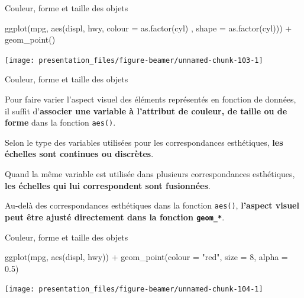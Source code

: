 \documentclass[12pt,handout,ignorenonframetext,]{beamer}
\newenvironment{Shaded}{}{}
\newcommand{\KeywordTok}[1]{\textcolor[rgb]{0.00,0.00,1.00}{{#1}}}
\newcommand{\DataTypeTok}[1]{{#1}}
\newcommand{\DecValTok}[1]{{#1}}
\newcommand{\FloatTok}[1]{{#1}}
\newcommand{\StringTok}[1]{\textcolor[rgb]{0.00,0.50,0.50}{{#1}}}
\newcommand{\NormalTok}[1]{{#1}}
\renewenvironment{Shaded}{\begin{snugshade}}{\end{snugshade}}
\begin{document}
\begin{frame}[fragile]{Couleur, forme et taille des objets}

\footnotesize \center

\begin{Shaded}
\begin{Highlighting}[]
\KeywordTok{ggplot}\NormalTok{(mpg, }\KeywordTok{aes}\NormalTok{(displ, hwy, }\DataTypeTok{colour =} \KeywordTok{as.factor}\NormalTok{(cyl)}
  \NormalTok{, }\DataTypeTok{shape =} \KeywordTok{as.factor}\NormalTok{(cyl))) +}
\StringTok{  }\KeywordTok{geom_point}\NormalTok{()}
\end{Highlighting}
\end{Shaded}

\texttt{[image: presentation\_files/figure-beamer/unnamed-chunk-103-1]}

\end{frame}

\begin{frame}{Couleur, forme et taille des objets}

Pour faire varier l'aspect visuel des éléments représentés en fonction
de données, il suffit
d'\textbf{associer une variable à l'attribut de couleur, de taille ou de forme}
dans la fonction \texttt{aes()}.

Selon le type des variables utilisées pour les correspondances
esthétiques, \textbf{les échelles sont continues ou discrètes}.

Quand la même variable est utilisée dans plusieurs correspondances
esthétiques,
\textbf{les échelles qui lui correspondent sont fusionnées}.

Au-delà des correspondances esthétiques dans la fonction \texttt{aes()},
\textbf{l'aspect visuel peut être ajusté directement dans la fonction \texttt{geom\_*}}.

\end{frame}

\begin{frame}[fragile]{Couleur, forme et taille des objets}

\footnotesize \center

\begin{Shaded}
\begin{Highlighting}[]
\KeywordTok{ggplot}\NormalTok{(mpg, }\KeywordTok{aes}\NormalTok{(displ, hwy)) +}
\StringTok{  }\KeywordTok{geom_point}\NormalTok{(}\DataTypeTok{colour =} \StringTok{"red"}\NormalTok{, }\DataTypeTok{size =} \DecValTok{8}\NormalTok{, }\DataTypeTok{alpha =} \FloatTok{0.5}\NormalTok{)}
\end{Highlighting}
\end{Shaded}

\texttt{[image: presentation\_files/figure-beamer/unnamed-chunk-104-1]}

\end{frame}
\end{document}
